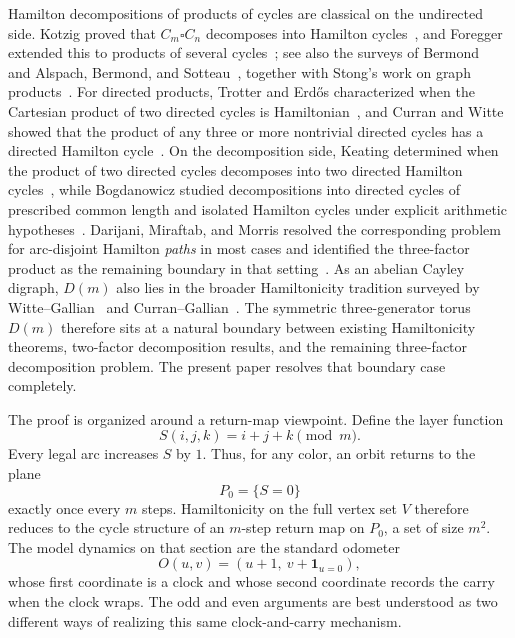 \documentclass[11pt]{article}
\begin{document}
Hamilton decompositions of products of cycles are classical on the undirected side.
Kotzig proved that $C_m\square C_n$ decomposes into Hamilton cycles~\cite{Kotzig1973}, and Foregger extended this to products of several cycles~\cite{Foregger1978}; see also the surveys of Bermond~\cite{Bermond1978} and Alspach, Bermond, and Sotteau~\cite{AlspachBermondSotteau1990}, together with Stong's work on graph products~\cite{Stong1991}.
For directed products, Trotter and Erd\H{o}s characterized when the Cartesian product of two directed cycles is Hamiltonian~\cite{TrotterErdos1978}, and Curran and Witte showed that the product of any three or more nontrivial directed cycles has a directed Hamilton cycle~\cite{CurranWitte1985}.
On the decomposition side, Keating determined when the product of two directed cycles decomposes into two directed Hamilton cycles~\cite{Keating1985}, while Bogdanowicz studied decompositions into directed cycles of prescribed common length and isolated Hamilton cycles under explicit arithmetic hypotheses~\cite{Bogdanowicz2017,Bogdanowicz2020}.
Darijani, Miraftab, and Morris resolved the corresponding problem for arc-disjoint Hamilton \emph{paths} in most cases and identified the three-factor product as the remaining boundary in that setting~\cite{DarijaniMiraftabMorris2022}.
As an abelian Cayley digraph, $D(m)$ also lies in the broader Hamiltonicity tradition surveyed by Witte--Gallian~\cite{WitteGallian1984} and Curran--Gallian~\cite{CurranGallian1996}.
The symmetric three-generator torus $D(m)$ therefore sits at a natural boundary between existing Hamiltonicity theorems, two-factor decomposition results, and the remaining three-factor decomposition problem.
The present paper resolves that boundary case completely.

The proof is organized around a return-map viewpoint.
Define the layer function
\[
S(i,j,k)=i+j+k\pmod m.
\]
Every legal arc increases $S$ by $1$.
Thus, for any color, an orbit returns to the plane
\[
P_0=\{S=0\}
\]
exactly once every $m$ steps.
Hamiltonicity on the full vertex set $V$ therefore reduces to the cycle structure of an $m$-step return map on $P_0$, a set of size $m^2$.
The model dynamics on that section are the standard odometer
\[
O(u,v)=(u+1,\ v+\mathbf 1_{u=0}),
\]
whose first coordinate is a clock and whose second coordinate records the carry when the clock wraps.
The odd and even arguments are best understood as two different ways of realizing this same clock-and-carry mechanism.
\end{document}
